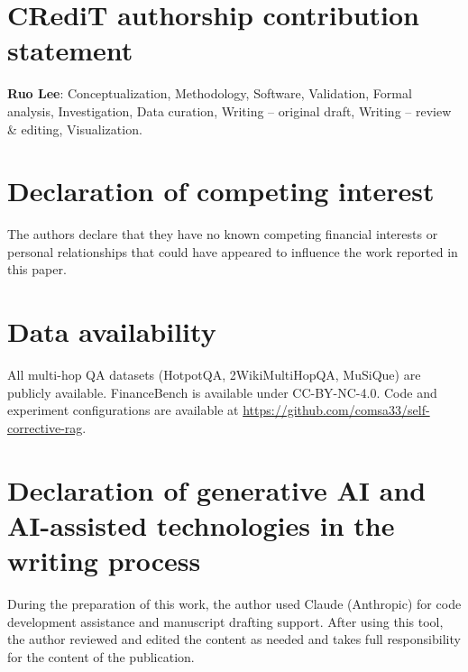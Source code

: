 \documentclass[preprint,review,number]{elsarticle}
\begin{document}
\section*{CRediT authorship contribution statement}

\textbf{Ruo Lee}: Conceptualization, Methodology, Software, Validation, Formal analysis, Investigation, Data curation, Writing -- original draft, Writing -- review \& editing, Visualization.

\section*{Declaration of competing interest}

The authors declare that they have no known competing financial interests or personal relationships that could have appeared to influence the work reported in this paper.

\section*{Data availability}

All multi-hop QA datasets (HotpotQA, 2WikiMultiHopQA, MuSiQue) are publicly available. FinanceBench is available under CC-BY-NC-4.0.
Code and experiment configurations are available at \url{https://github.com/comsa33/self-corrective-rag}.

\section*{Declaration of generative AI and AI-assisted technologies in the writing process}

During the preparation of this work, the author used Claude (Anthropic) for code development assistance and manuscript drafting support.
After using this tool, the author reviewed and edited the content as needed and takes full responsibility for the content of the publication.


\end{document}
